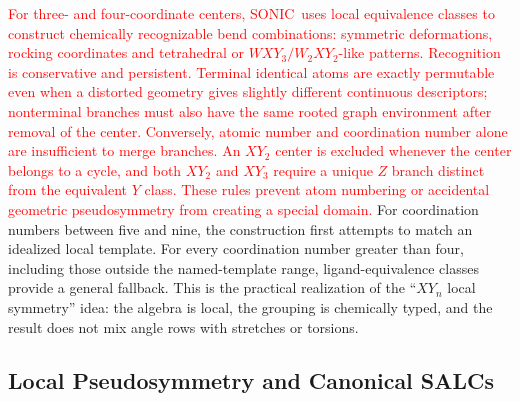 \documentclass[journal=jctcce,manuscript=article,layout=traditional]{achemso}
\newcommand{\SONIC}{SONIC}
\theoremstyle{definition}
\begin{document}
\textcolor{red}{For three- and four-coordinate centers, \SONIC\ uses local
equivalence classes to construct chemically recognizable bend combinations:
symmetric deformations, rocking coordinates and tetrahedral or
\(WXY_3/W_2XY_2\)-like patterns.  Recognition is conservative and persistent.
Terminal identical atoms are exactly permutable even when a distorted geometry
gives slightly different continuous descriptors; nonterminal branches must
also have the same rooted graph environment after removal of the center.
Conversely, atomic number and coordination number alone are insufficient to
merge branches.  An \(XY_2\) center is excluded whenever the center belongs to
a cycle, and both \(XY_2\) and \(XY_3\) require a unique \(Z\) branch distinct
from the equivalent \(Y\) class.  These rules prevent atom numbering or
accidental geometric pseudosymmetry from creating a special domain.}
For coordination numbers between five and nine, the construction first
attempts to match an idealized local template.  For every coordination number
greater than four, including those outside the named-template range,
ligand-equivalence classes provide a general fallback.  This is the practical
realization of the ``\(XY_n\) local symmetry'' idea: the algebra is local, the
grouping is chemically typed, and the result does not mix angle rows with
stretches or torsions.

\subsection{Local Pseudosymmetry and Canonical SALCs}
\end{document}
